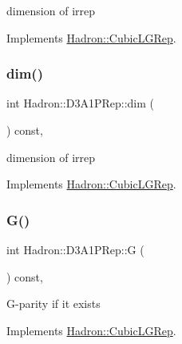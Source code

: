 dimension of irrep 

Implements \mbox{\hyperlink{structHadron_1_1CubicLGRep_a3acbaea26503ed64f20df693a48e4cdd}{Hadron\+::\+Cubic\+L\+G\+Rep}}.

\mbox{\label{structHadron_1_1D3A1PRep_a250e3d75bd0193a38ca00df99dfd1936}} 
\subsubsection{\texorpdfstring{dim()}{dim()}\hspace{0.1cm}{\footnotesize\ttfamily [2/2]}}
{\footnotesize\ttfamily int Hadron\+::\+D3\+A1\+P\+Rep\+::dim (\begin{DoxyParamCaption}{ }\end{DoxyParamCaption}) const\hspace{0.3cm}{\ttfamily [inline]}, {\ttfamily [virtual]}}

dimension of irrep 

Implements \mbox{\hyperlink{structHadron_1_1CubicLGRep_a3acbaea26503ed64f20df693a48e4cdd}{Hadron\+::\+Cubic\+L\+G\+Rep}}.

\mbox{\label{structHadron_1_1D3A1PRep_a5598aa20a6886bf4d30c2610d30e4836}} 
\subsubsection{\texorpdfstring{G()}{G()}\hspace{0.1cm}{\footnotesize\ttfamily [1/2]}}
{\footnotesize\ttfamily int Hadron\+::\+D3\+A1\+P\+Rep\+::G (\begin{DoxyParamCaption}{ }\end{DoxyParamCaption}) const\hspace{0.3cm}{\ttfamily [inline]}, {\ttfamily [virtual]}}

G-\/parity if it exists 

Implements \mbox{\hyperlink{structHadron_1_1CubicLGRep_ace26f7b2d55e3a668a14cb9026da5231}{Hadron\+::\+Cubic\+L\+G\+Rep}}.

\mbox{\label{structHadron_1_1D3A1PRep_a5598aa20a6886bf4d30c2610d30e4836}} 
